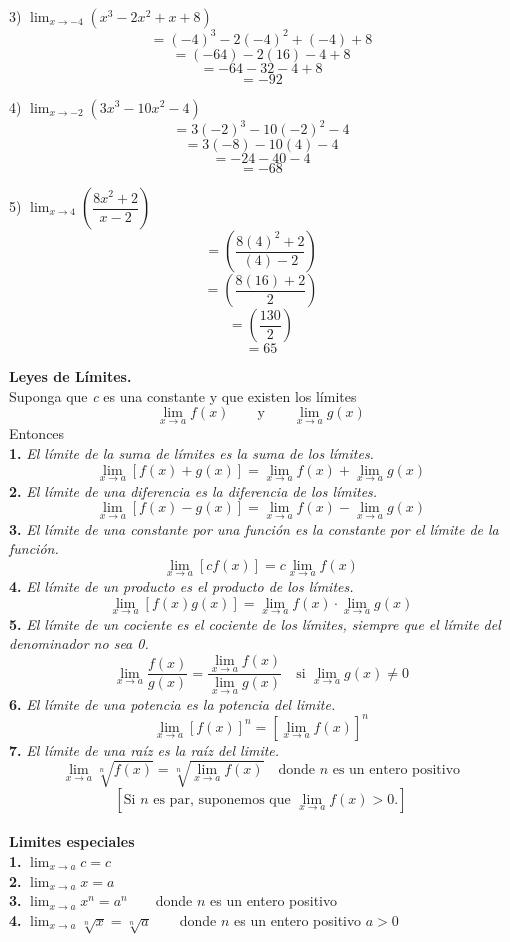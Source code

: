 \documentclass[11pt]{report}
\begin{document}
3) $\lim_{x\to-4} (x^3-2x^2+x+8)$\\[2mm]
$$=(-4)^3-2(-4)^2+(-4)+8$$
$$=(-64)-2(16)-4+8$$
$$=-64-32-4+8$$
$$=-92$$

4) $\lim_{x\to-2} (3x^3-10x^2-4)$\\[2mm]
$$=3(-2)^3-10(-2)^2-4$$
$$=3(-8)-10(4)-4$$
$$=-24-40-4$$
$$=-68$$

5) $\lim_{x\to4} \left(\dfrac{8x^2+2}{x-2}\right)$\\[2mm]
$$=\left(\dfrac{8(4)^2+2}{(4)-2}\right)$$
$$=\left(\dfrac{8(16)+2}{2}\right)$$
$$=\left(\dfrac{130}{2}\right)$$
$$=65$$

\pagebreak \textbf{Leyes de Límites.}\\[2mm]
Suponga que \textit{c} es una constante y que existen los límites
$$\lim_{x \to a}f(x)\qquad \text{y} \qquad\lim_{x \to a}g(x)$$
Entonces\\[2mm]
\textbf{1. }\textit{El límite de la suma de límites es la suma de los límites.}
$$\lim_{x \to a}[f(x) + g(x)] = \lim_{x \to a}f(x) + \lim_{x \to a}g(x)$$
\textbf{2. }\textit{El límite de una diferencia es la diferencia de los límites.}
$$\lim_{x \to a}[f(x) - g(x)] = \lim_{x \to a}f(x) - \lim_{x \to a}g(x)$$
\textbf{3. }\textit{El límite de una constante por una función es la constante por el límite de la función.}
$$\lim_{x \to a}[cf(x)] = c\lim_{x \to a}f(x)$$
\textbf{4. }\textit{El límite de un producto es el producto de los límites.}
$$\lim_{x \to a}[f(x)g(x)] = \lim_{x \to a}f(x) \cdot \lim_{x \to a}g(x)$$
\textbf{5. }\textit{El límite de un cociente es el cociente de los límites, siempre que el límite del denominador no sea 0.}
$$\lim_{x \to a}\frac{f(x)}{g(x)}=\frac{\lim_{x \to a}f(x)}{\lim_{x \to a}g(x)} \quad \text{si }\lim_{x \to a}g(x) \neq 0$$
\textbf{6. }\textit{El límite de una potencia es la potencia del limite.}
$$\lim_{x \to a}[f(x)]^n=[\lim_{x \to a}f(x)]^n$$
\textbf{7. }\textit{El límite de una raíz es la raíz del limite.}
$$\lim_{x \to a}\sqrt[n]{f(x)}=\sqrt[n]{\lim_{x \to a}f(x)} \quad \text{donde }n\text{ es un entero positivo}$$
$$[\text{Si }n \text{ es par, suponemos que }\lim_{x \to a}f(x)>0.]$$\\[2mm]

\textbf{Limites especiales}\\[2mm]
\textbf{1. }$\lim_{x \to a}c=c$\\[2mm]
\textbf{2. }$\lim_{x \to a}x=a$\\[2mm]
\textbf{3. }$\lim_{x \to a}x^n=a^n \qquad$donde $n$ es un entero positivo\\[2mm]
\textbf{4. }$\lim_{x \to a}\sqrt[n]{x}=\sqrt[n]{a} \qquad$donde $n$ es un entero positivo $a>0$
\end{document}
